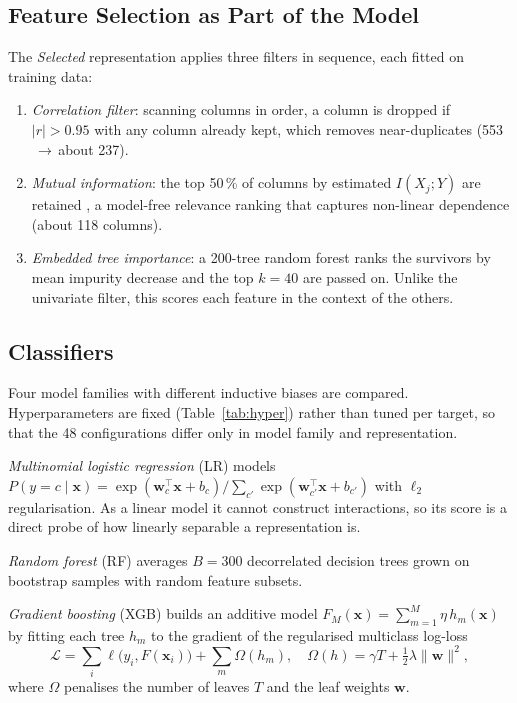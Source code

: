 \documentclass[conference]{IEEEtran}
\begin{document}
\subsection{Feature Selection as Part of the Model}
\label{sec:selection}
The \textit{Selected} representation applies three filters in sequence, each
fitted on training data:
\begin{enumerate}
\item \textit{Correlation filter}: scanning columns in order, a column is
dropped if $|r|>0.95$ with any column already kept, which removes
near-duplicates (553$\,\rightarrow\,$about 237).
\item \textit{Mutual information}: the top 50\,\% of columns by estimated
$I(X_j;Y)$ are retained \cite{kraskov2004}, a model-free relevance ranking that
captures non-linear dependence (about 118 columns).
\item \textit{Embedded tree importance}: a 200-tree random forest ranks the
survivors by mean impurity decrease and the top $k=40$ are passed on. Unlike
the univariate filter, this scores each feature in the context of the others.
\end{enumerate}

\subsection{Classifiers}
Four model families with different inductive biases are compared.
Hyperparameters are fixed (Table~\ref{tab:hyper}) rather than tuned per target,
so that the 48 configurations differ only in model family and representation.

\textit{Multinomial logistic regression} (LR) models
$P(y=c\mid\mathbf{x})=\exp(\mathbf{w}_c^{\top}\mathbf{x}+b_c)/
\sum_{c'}\exp(\mathbf{w}_{c'}^{\top}\mathbf{x}+b_{c'})$ with $\ell_2$
regularisation. As a linear model it cannot construct interactions, so its
score is a direct probe of how linearly separable a representation is.

\textit{Random forest} (RF) \cite{breiman2001} averages $B=300$ decorrelated
decision trees grown on bootstrap samples with random feature subsets.

\textit{Gradient boosting} (XGB) \cite{chen2016} builds an additive model
$F_M(\mathbf{x})=\sum_{m=1}^{M}\eta\,h_m(\mathbf{x})$ by fitting each tree
$h_m$ to the gradient of the regularised multiclass log-loss
\begin{equation}
\mathcal{L}=\sum_{i} \ell\bigl(y_i,F(\mathbf{x}_i)\bigr)+\sum_{m}\Omega(h_m),\quad
\Omega(h)=\gamma T+\tfrac{1}{2}\lambda\lVert\mathbf{w}\rVert^2,
\end{equation}
where $\Omega$ penalises the number of leaves $T$ and the leaf weights
$\mathbf{w}$.
\end{document}
